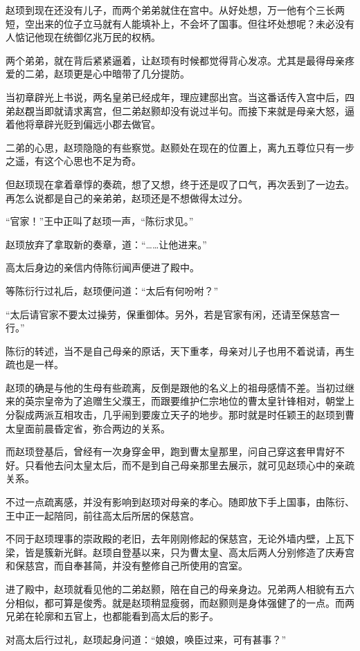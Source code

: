 赵顼到现在还没有儿子，而两个弟弟就住在宫中。从好处想，万一他有个三长两短，空出来的位子立马就有人能填补上，不会坏了国事。但往坏处想呢？未必没有人惦记他现在统御亿兆万民的权柄。

两个弟弟，就在背后紧紧逼着，让赵顼有时候都觉得背心发凉。尤其是最得母亲疼爱的二弟，赵顼更是心中暗带了几分提防。

当初章辟光上书说，两名皇弟已经成年，理应建邸出宫。当这番话传入宫中后，四弟赵覠当即就请求离宫，但二弟赵颢却没有说过半句。而接下来就是母亲大怒，逼着他将章辟光贬到偏远小郡去做官。

二弟的心思，赵顼隐隐的有些察觉。赵颢处在现在的位置上，离九五尊位只有一步之遥，有这个心思也不足为奇。

但赵顼现在拿着章惇的奏疏，想了又想，终于还是叹了口气，再次丢到了一边去。再怎么说都是自己的亲弟弟，赵顼还是不想做得太过分。

“官家！”王中正叫了赵顼一声，“陈衍求见。”

赵顼放弃了拿取新的奏章，道：“……让他进来。”

高太后身边的亲信内侍陈衍闻声便进了殿中。

等陈衍行过礼后，赵顼便问道：“太后有何吩咐？”

“太后请官家不要太过操劳，保重御体。另外，若是官家有闲，还请至保慈宫一行。”

陈衍的转述，当不是自己母亲的原话，天下重孝，母亲对儿子也用不着说请，再生疏也是一样。

赵顼的确是与他的生母有些疏离，反倒是跟他的名义上的祖母感情不差。当初过继来的英宗皇帝为了追赠生父濮王，而跟要维护仁宗地位的曹太皇针锋相对，朝堂上分裂成两派互相攻击，几乎闹到要废立天子的地步。那时就是时任颖王的赵顼到曹太皇面前晨昏定省，弥合两边的关系。

而赵顼登基后，曾经有一次身穿金甲，跑到曹太皇那里，问自己穿这套甲胄好不好。只看他去问太皇太后，而不是到自己母亲那里去展示，就可见赵顼心中的亲疏关系。

不过一点疏离感，并没有影响到赵顼对母亲的孝心。随即放下手上国事，由陈衍、王中正一起陪同，前往高太后所居的保慈宫。

不同于赵顼理事的崇政殿的老旧，去年刚刚修起的保慈宫，无论外墙内壁，上瓦下梁，皆是簇新光鲜。赵顼自登基以来，只为曹太皇、高太后两人分别修造了庆寿宫和保慈宫，而自奉甚简，并没有整修自己所使用的宫室。

进了殿中，赵顼就看见他的二弟赵颢，陪在自己的母亲身边。兄弟两人相貌有五六分相似，都可算是俊秀。就是赵顼稍显瘦弱，而赵颢则是身体强健了的一点。而两兄弟在轮廓和五官上，也都能看到高太后的影子。

对高太后行过礼，赵顼起身问道：“娘娘，唤臣过来，可有甚事？”

